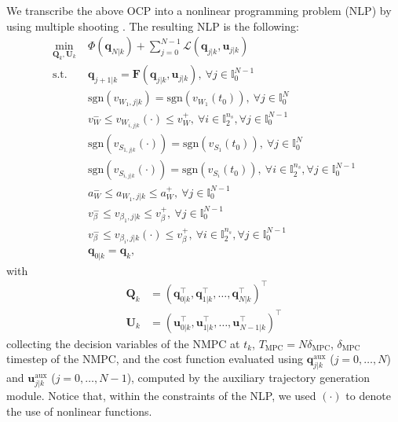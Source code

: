 We transcribe the above OCP into a nonlinear programming problem (NLP) by using multiple shooting \cite{Bock1984MultipleShooting}. The resulting NLP is the following:
\begin{equation*}
    \begin{aligned}
        \min_{\bm{Q}_k, \bm{U}_k} \;
            & \Phi(\bm{q}_{N|k}) + \sum_{j=0}^{N-1} \mathcal{L}(\bm{q}_{j|k}, \bm{u}_{j|k}) \\
            \text{s.t. } & \bm{q}_{j+1|k} = \bm{F}(\bm{q}_{j|k}, \bm{u}_{j|k}),\: \forall j \in \mathbb{I}_0^{N-1} \\
                         & \mathrm{sgn}(v_{W_1,j|k}) = \mathrm{sgn}(v_{W_1}(t_0)),\: \forall j \in \mathbb{I}_0^N \\
                         & v_W^- \le v_{W_{i,j|k}}(\cdot) \le v_W^+,\: \forall i \in \mathbb{I}_2^{n_s}, \forall j \in \mathbb{I}_0^{N-1} \\
                         & \mathrm{sgn}(v_{S_{1,j|k}}(\cdot)) = \mathrm{sgn}(v_{S_1}(t_0)),\: \forall j \in \mathbb{I}_0^N \\
                         & \mathrm{sgn}(v_{S_{i,j|k}}(\cdot)) = \mathrm{sgn}(v_{S_i}(t_0)),\: \forall i \in \mathbb{I}_2^{n_s}, \forall j \in \mathbb{I}_0^{N-1} \\
                         & a_W^- \le a_{W_1,j|k} \le a_W^+,\: \forall j \in \mathbb{I}_0^{N-1} \\
                         & v_{\beta}^- \le v_{\beta_1,j|k} \le v_{\beta}^+,\: \forall j \in \mathbb{I}_0^{N-1} \\
                         & v_{\beta}^- \le v_{\beta_i,j|k}(\cdot) \le v_{\beta}^+,\: \forall i \in \mathbb{I}_2^{n_s}, \forall j \in \mathbb{I}_0^{N-1} \\
                         & \bm{q}_{0|k} = \bm{q}_k,
    \end{aligned}
\end{equation*}
with
\begin{align*}
\bm{Q}_k &= (\bm{q}_{0|k}^\top, \bm{q}_{1|k}^\top, \dots, \bm{q}_{N|k}^\top)^\top \\
\bm{U}_k &= (\bm{u}_{0|k}^\top, \bm{u}_{1|k}^\top, \dots, \bm{u}_{N-1|k}^\top)^\top
\end{align*}
collecting the decision variables of the NMPC at $t_k$, $T_{\mathrm{MPC}}=N\delta_{\mathrm{MPC}}$, $\delta_{\mathrm{MPC}}$ timestep of the NMPC, and the cost function evaluated using $\bm{q}_{j|k}^{\mathrm{aux}}$ ($j = 0, \dots, N$) and $\bm{u}_{j|k}^{\mathrm{aux}}$ ($j = 0, \dots, N - 1$), computed by the auxiliary trajectory generation module. Notice that, within the constraints of the NLP, we used $(\cdot)$ to denote the use of nonlinear functions.

